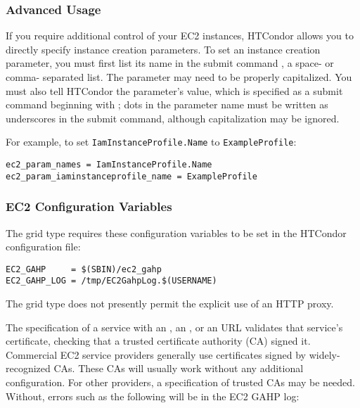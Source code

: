 \subsubsection{\label{sec:Amazon-parameters}Advanced Usage}

If you require additional control of your EC2 instances, HTCondor allows
you to directly specify instance creation parameters.  To set an instance
creation parameter, you must first list its name in the submit command
, a space- or comma- separated list.  The
parameter may need to be properly capitalized.  You must also tell HTCondor
the parameter's value, which is specified as a submit command beginning with
; dots in the parameter name must be
written as underscores in the submit command, although capitalization may
be ignored.

For example, to set \texttt{IamInstanceProfile.Name} to \texttt{ExampleProfile}:

\begin{verbatim}
ec2_param_names = IamInstanceProfile.Name
ec2_param_iaminstanceprofile_name = ExampleProfile
\end{verbatim}

\subsubsection{\label{sec:Amazon-config}EC2 Configuration Variables}

The  grid type requires these configuration variables 
to be set in the HTCondor configuration file:

\footnotesize
\begin{verbatim}
EC2_GAHP     = $(SBIN)/ec2_gahp
EC2_GAHP_LOG = /tmp/EC2GahpLog.$(USERNAME)
\end{verbatim}
\normalsize

The  grid type does not presently permit the explicit use 
of an HTTP proxy.

The specification of a service with an , an ,
or an  URL validates that service's certificate,
checking that a trusted certificate authority (CA) signed it.
Commercial EC2 service providers generally use certificates signed by 
widely-recognized CAs.
These CAs will usually work without any additional configuration.  
For other providers, a specification of trusted CAs may be needed.
Without, errors such as the following will be in the EC2 GAHP log:


